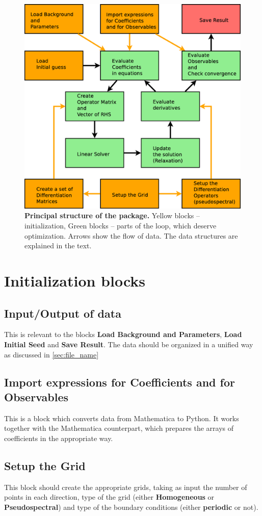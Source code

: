 \documentclass[a4paper,12pt]{article}
\begin{document}
\begin{figure}[ht]
\center
\includegraphics[width=0.8 \linewidth]{Package_Structure.eps}
\caption{\label{structure} \textbf{Principal structure of the package.} Yellow blocks -- initialization, Green blocks -- parts of the loop, which deserve optimization. Arrows show the flow of data. The data structures are explained in the text.}
\end{figure}

\section{Initialization blocks}

\subsection{\label{sec:io_data} Input/Output of data}
This is relevant to the blocks \textbf{Load Background and Parameters}, \textbf{Load Initial Seed} and \textbf{Save Result}. The data should be organized in a unified way as discussed in \ref{sec:file_name}


\subsection{\label{sec:import_expressions}Import expressions for Coefficients and for Observables}
This is a block which converts data from Mathematica to Python. It works together with the Mathematica counterpart, which prepares the arrays of coefficients in the appropriate way.

\subsection{\label{sec:setup_grid} Setup the Grid}
This block should create the appropriate grids, taking as input the number of points in each direction, type of the grid (either \textbf{Homogeneous} or \textbf{Pseudospectral}) and type of the boundary conditions (either \textbf{periodic} or not).
\end{document}
